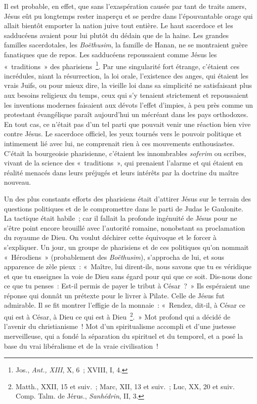 \documentclass[french,twoside]{book} %
\begin{document}
Il est probable, en effet, que sans l’exaspération causée par tant de traits amers, Jésus eût pu longtemps rester inaperçu et se perdre dans l’épouvantable orage qui allait bientôt emporter la nation juive tout entière. Le haut sacerdoce et les sadducéens avaient pour lui plutôt du dédain que de la haine. Les grandes familles sacerdotales, les {\itshape Boëthusim}, la famille de Hanan, ne se montraient guère fanatiques que de repos. Les sadducéens repoussaient comme Jésus les « traditions » des pharisiens \footnote{ Jos., {\itshape Ant., XIII}, X, 6 ; XVIII, I, 4.}. Par une singularité fort étrange, c’étaient ces incrédules, niant la résurrection, la loi orale, l’existence des anges, qui étaient les vrais Juifs, ou pour mieux dire, la vieille loi dans sa simplicité ne satisfaisant plus aux besoins religieux du temps, ceux qui s’y tenaient strictement et repoussaient les inventions modernes faisaient aux dévots l’effet d’impies, à peu près comme un protestant évangélique paraît aujourd’hui un mécréant dans les pays orthodoxes. En tout cas, ce n’était pas d’un tel parti que pouvait venir une réaction bien vive contre Jésus. Le sacerdoce officiel, les yeux tournés vers le pouvoir politique et intimement lié avec lui, ne comprenait rien à ces mouvements enthousiastes. C’était la bourgeoisie pharisienne, c’étaient les innombrables {\itshape soferim} ou scribes, vivant de la science des « traditions », qui prenaient l’alarme et qui étaient en réalité menacés dans leurs préjugés et leurs intérêts par la doctrine du maître nouveau.\par
Un des plus constants efforts des pharisiens était d’attirer Jésus sur le terrain des questions politiques et de le compromettre dans le parti de Judas le Gaulonite. La tactique était habile ; car il fallait la profonde ingénuité de Jésus pour ne s’être point encore brouillé avec l’autorité romaine, nonobstant sa proclamation du royaume de Dieu. On voulut déchirer cette équivoque et le forcer à s’expliquer. Un jour, un groupe de pharisiens et de ces politiques qu’on nommait « Hérodiens » (probablement des {\itshape Boëthusim}), s’approcha de lui, et sous apparence de zèle pieux : « Maître, lui dirent-ils, nous savons que tu es véridique et que tu enseignes la voie de Dieu sans égard pour qui que ce soit. Dis-nous donc ce que tu penses : Est-il permis de payer le tribut à César ? » Ils espéraient une réponse qui donnât un prétexte pour le livrer à Pilate. Celle de Jésus fut admirable. Il se fit montrer l’effigie de la monnaie : « Rendez, dit-il, à César ce qui est à César, à Dieu ce qui est à Dieu \footnote{ Matth., XXII, 15 et suiv. ; Marc, XII, 13 et suiv. ; Luc, XX, 20 et suiv. Comp. Talm. de Jérus., {\itshape Sanhédrin}, II, 3.}. » Mot profond qui a décidé de l’avenir du christianisme ! Mot d’un spiritualisme accompli et d’une justesse merveilleuse, qui a fondé la séparation du spirituel et du temporel, et a posé la base du vrai libéralisme et de la vraie civilisation !\par
\end{document}
